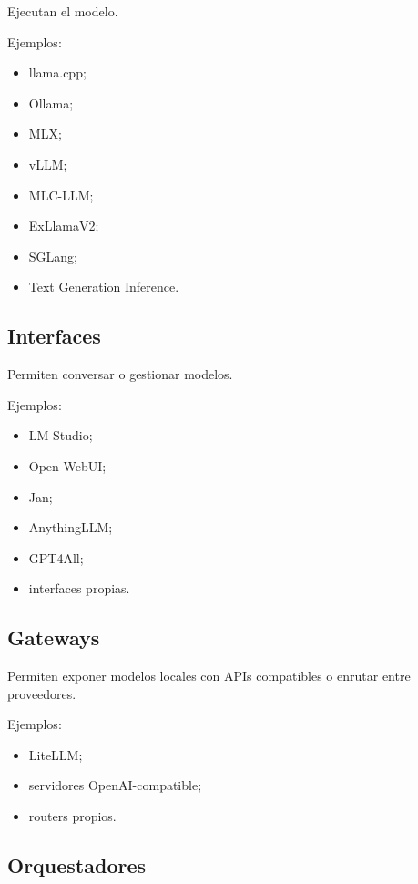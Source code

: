 Ejecutan el modelo.

Ejemplos:

\begin{itemize}
\tightlist
\item
  llama.cpp;
\item
  Ollama;
\item
  MLX;
\item
  vLLM;
\item
  MLC-LLM;
\item
  ExLlamaV2;
\item
  SGLang;
\item
  Text Generation Inference.
\end{itemize}

\subsection{Interfaces}\label{interfaces}

Permiten conversar o gestionar modelos.

Ejemplos:

\begin{itemize}
\tightlist
\item
  LM Studio;
\item
  Open WebUI;
\item
  Jan;
\item
  AnythingLLM;
\item
  GPT4All;
\item
  interfaces propias.
\end{itemize}

\subsection{Gateways}\label{gateways}

Permiten exponer modelos locales con APIs compatibles o enrutar entre
proveedores.

Ejemplos:

\begin{itemize}
\tightlist
\item
  LiteLLM;
\item
  servidores OpenAI-compatible;
\item
  routers propios.
\end{itemize}

\subsection{Orquestadores}\label{orquestadores}

